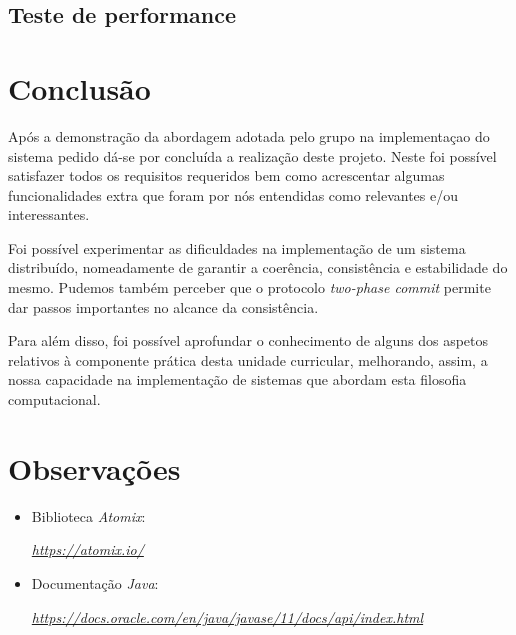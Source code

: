 \documentclass[a4paper]{report}
\begin{document}
	\section{Teste de performance} %

\chapter{Conclusão}
\large{
	Após a demonstração da abordagem adotada pelo grupo na implementaçao do sistema pedido dá-se por concluída a realização deste projeto. 
	Neste foi possível satisfazer todos os requisitos requeridos bem como acrescentar algumas funcionalidades extra que foram por nós entendidas como relevantes e/ou interessantes.

	Foi possível experimentar as dificuldades na implementação de um sistema distribuído, nomeadamente de garantir a coerência, consistência e estabilidade do mesmo.
	Pudemos também perceber que o protocolo \textit{two-phase commit} permite dar passos importantes no alcance da consistência.

	Para além disso, foi possível aprofundar o conhecimento de alguns dos aspetos relativos à componente prática desta unidade curricular, melhorando, assim, 
	a nossa capacidade na implementação de sistemas que abordam esta filosofia computacional.
}

\appendix
\chapter{Observações}
\begin{itemize}
	\item Biblioteca \textit{Atomix}:
	\par \textit{\url{https://atomix.io/}}
	\item Documentação \textit{Java}:
	\par \textit{\url{https://docs.oracle.com/en/java/javase/11/docs/api/index.html}}
\end{itemize}
\end{document}
